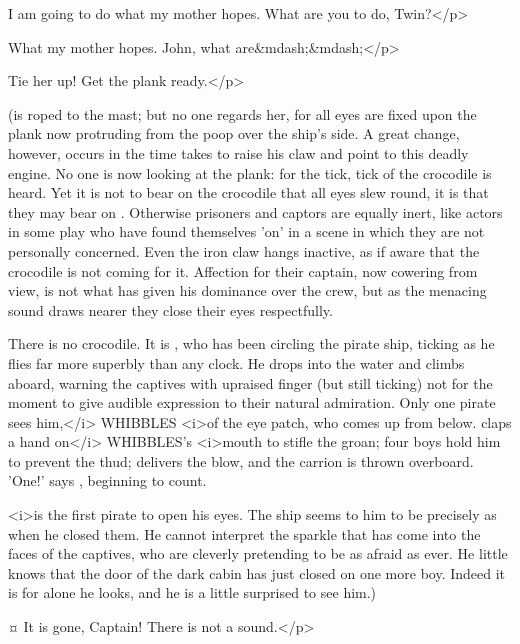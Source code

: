 \begin{drama}

\tootlesspeaks
I am going to do what my mother hopes.
What are you to do, Twin?</p>

\firsttwinspeaks
What my mother hopes.
John, what are&mdash;&mdash;</p>

\hookspeaks
Tie her up!
Get the plank ready.</p>

\begin{stagedir}
(\wendy is roped to the mast;
but no one regards her, for all eyes are fixed upon the plank now protruding from the poop over the ship's side.
A great change, however, occurs in the time \hook takes to raise his claw and point to this deadly engine.
No one is now looking at the plank: for the tick, tick of the crocodile is heard.
Yet it is not to bear on the crocodile that all eyes slew round, it is that they may bear on \hook.
Otherwise prisoners and captors are equally inert,
like actors in some play who have found themselves 'on' in a scene in which they are not personally concerned.
Even the iron claw hangs inactive, as if aware that the crocodile is not coming for it.
Affection for their captain, now cowering from view, is not what has given \hook his dominance over the crew,
but as the menacing sound draws nearer they close their eyes respectfully.

There is no crocodile.
It is \peter, who has been circling the pirate ship, ticking as he flies far more superbly than any clock.
He drops into the water and climbs aboard, warning the captives with upraised finger (but still ticking)
not for the moment to give audible expression to their natural admiration.
Only one pirate sees him,</i> {\namefont WHIBBLES} <i>of the eye patch, who comes up from below.
\john claps a hand on</i> {\namefont WHIBBLES}'s <i>mouth to stifle the groan;
four boys hold him to prevent the thud;
\peter delivers the blow, and the carrion is thrown overboard.
'One!\@' says \slightly, beginning to count.

\starkey <i>is the first pirate to open his eyes.
The ship seems to him to be precisely as when he closed them.
He cannot interpret the sparkle that has come into the faces of the captives,
who are cleverly pretending to be as afraid as ever.
He little knows that the door of the dark cabin has just closed on one more boy.
Indeed it is for \hook alone he looks, and he is a little surprised to see him.)
\end{stagedir}

\starkeyspeaks {}¤
It is gone, Captain!
There is not a sound.</p>


\end{drama}
